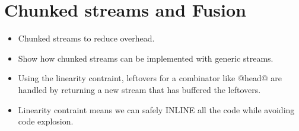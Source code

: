 \section{Chunked streams and Fusion}
\label{s:Chunked}

\begin{itemize}
\item Chunked streams to reduce overhead.
\item Show how chunked streams can be implemented with generic streams.
\item Using the linearity contraint, leftovers for a combinator like @head@ are handled by returning a new stream that has buffered the leftovers.
\item Linearity contraint means we can safely INLINE all the code while avoiding code explosion.


\end{itemize}
